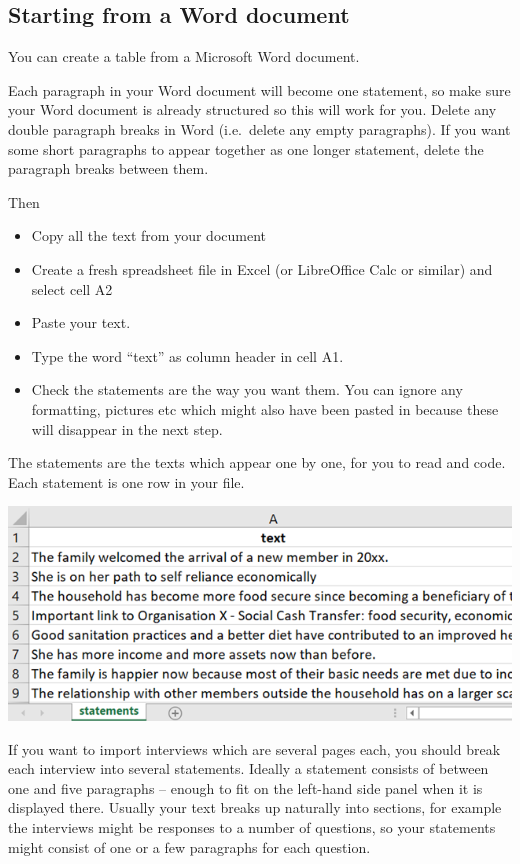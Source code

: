 \documentclass[
]{book}
\providecommand{\tightlist}{%
  \setlength{\itemsep}{0pt}\setlength{\parskip}{0pt}}
\begin{document}
\hypertarget{starting-from-a-word-document}{%
\subsection{Starting from a Word document}\label{starting-from-a-word-document}}

You can create a table from a Microsoft Word document.

Each paragraph in your Word document will become one statement, so make sure your Word document is already structured so this will work for you. Delete any double paragraph breaks in Word (i.e.~delete any empty paragraphs). If you want some short paragraphs to appear together as one longer statement, delete the paragraph breaks between them.

Then

\begin{itemize}
\tightlist
\item
  Copy all the text from your document
\item
  Create a fresh spreadsheet file in Excel (or LibreOffice Calc or similar) and select cell A2
\item
  Paste your text.
\item
  Type the word ``text'' as column header in cell A1.
\item
  Check the statements are the way you want them. You can ignore any formatting, pictures etc which might also have been pasted in because these will disappear in the next step.
\end{itemize}

The statements are the texts which appear one by one, for you to read and code. Each statement is one row in your file.

\includegraphics[width=6.77083in,height=\textheight]{_assets/image-20211018160023515.png}

If you want to import interviews which are several pages each, you should break each interview into several statements. Ideally a statement consists of between one and five paragraphs -- enough to fit on the left-hand side panel when it is displayed there. Usually your text breaks up naturally into sections, for example the interviews might be responses to a number of questions, so your statements might consist of one or a few paragraphs for each question.
\end{document}
